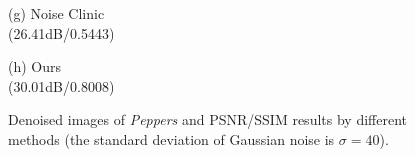 \documentclass[runningheads]{llncs}
\begin{document}
\begin{figure}
{\begin{minipage}[t]{0.244\textwidth}
{\footnotesize (g) Noise Clinic \\(26.41dB/0.5443)}
\end{minipage}
\begin{minipage}[t]{0.244\textwidth}
\centering
{}
{\footnotesize (h) Ours \\(30.01dB/0.8008)}
\end{minipage}
}
\caption{Denoised images of \textsl{Peppers} and PSNR/SSIM results by different methods (the standard deviation of Gaussian noise is $\sigma=40$).}
\label{fig3}
\end{figure}
\end{document}
